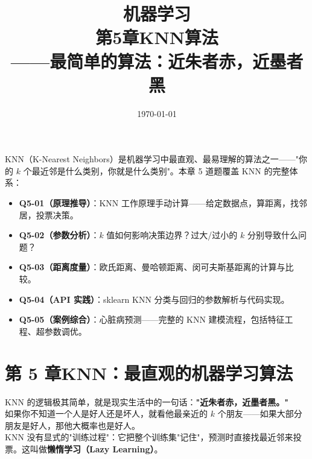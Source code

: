 \documentclass[a4paper,11pt]{ctexart}
\title{\textbf{机器学习\\第5章\quad KNN算法}\\[0.5em]
{\large\color{gray}——最简单的算法：近朱者赤，近墨者黑}}
\date{\today}
\begin{document}
\maketitle

\begin{beginnerbox}
    KNN（K-Nearest Neighbors）是机器学习中最直观、最易理解的算法之一——"你的 $k$ 个最近邻是什么类别，你就是什么类别"。本章 5 道题覆盖 KNN 的完整体系：
    \begin{itemize}
        \item \textbf{Q5-01（原理推导）}：KNN 工作原理手动计算——给定数据点，算距离，找邻居，投票决策。
        \item \textbf{Q5-02（参数分析）}：$k$ 值如何影响决策边界？过大/过小的 $k$ 分别导致什么问题？
        \item \textbf{Q5-03（距离度量）}：欧氏距离、曼哈顿距离、闵可夫斯基距离的计算与比较。
        \item \textbf{Q5-04（API 实践）}：sklearn KNN 分类与回归的参数解析与代码实现。
        \item \textbf{Q5-05（案例综合）}：心脏病预测——完整的 KNN 建模流程，包括特征工程、超参数调优。
    \end{itemize}
\end{beginnerbox}

\section{第 5 章\quad KNN：最直观的机器学习算法}

\begin{metaphorbox}
    KNN 的逻辑极其简单，就是现实生活中的一句话：\textbf{"近朱者赤，近墨者黑。"}\\
    如果你不知道一个人是好人还是坏人，就看他最亲近的 $k$ 个朋友——如果大部分朋友是好人，那他大概率也是好人。\\
    KNN 没有显式的"训练过程"：它把整个训练集"记住"，预测时直接找最近邻来投票。这叫做\textbf{懒惰学习（Lazy Learning）}。
\end{metaphorbox}
\end{document}
